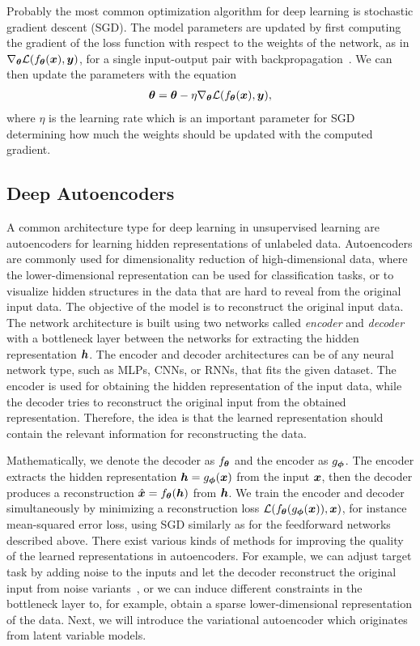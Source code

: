 Probably the most common optimization algorithm for deep learning is stochastic gradient descent (SGD). The model parameters are updated by first computing the gradient of the loss function with respect to the weights of the network, as in $\nabla_{{\bm{\theta}}} {\mathcal{L}}(f_{{\bm{\theta}}}({\bm{x}}), {\bm{y}})$, for a single input-output pair with backpropagation~\cite{rumelhart1986learning}. We can then update the parameters with the equation 
\begin{align}\label{eq:weight_update_sgd}
	{\bm{\theta}} = {\bm{\theta}} - \eta \nabla_{{\bm{\theta}}} {\mathcal{L}}(f_{{\bm{\theta}}}({\bm{x}}), {\bm{y}}),
\end{align} 
where $\eta$ is the learning rate which is an important parameter for SGD determining how much the weights should be updated with the computed gradient. 



\subsection{Deep Autoencoders}

A common architecture type for deep learning in unsupervised learning are autoencoders for learning hidden representations of unlabeled data. Autoencoders are commonly used for dimensionality reduction of high-dimensional data, where the lower-dimensional representation can be used for classification tasks, or to visualize hidden structures in the data that are hard to reveal from the original input data. The objective of the model is to reconstruct the original input data. The network architecture is built using two networks called \textit{encoder} and \textit{decoder} with a bottleneck layer between the networks for extracting the hidden representation ${\bm{h}}$. The encoder and decoder architectures can be of any neural network type, such as MLPs, CNNs, or RNNs, that fits the given dataset. The encoder is used for obtaining the hidden representation of the input data, while the decoder tries to reconstruct the original input from the obtained representation. Therefore, the idea is that the learned representation should contain the relevant information for reconstructing the data. 

Mathematically, we denote the decoder as $f_{{\bm{\theta}}}$ and the encoder as $g_{{\bm{\phi}}}$. The encoder extracts the hidden representation ${\bm{h}} = g_{{\bm{\phi}}}({\bm{x}})$ from the input ${\bm{x}}$, then the decoder produces a reconstruction $\hat{{\bm{x}}} = f_{{\bm{\theta}}}({\bm{h}})$ from ${\bm{h}}$. We train the encoder and decoder simultaneously by minimizing a reconstruction loss ${\mathcal{L}}(f_{{\bm{\theta}}}(g_{{\bm{\phi}}}({\bm{x}})), {\bm{x}})$, for instance mean-squared error loss, using SGD similarly as for the feedforward networks described above. There exist various kinds of methods for improving the quality of the learned representations in autoencoders. For example, we can adjust target task by adding noise to the inputs and let the decoder reconstruct the original input from noise variants~\cite{vincent2008extracting}, or we can induce different constraints in the bottleneck layer to, for example, obtain a sparse lower-dimensional representation of the data. Next, we will introduce the variational autoencoder which originates from latent variable models. 

